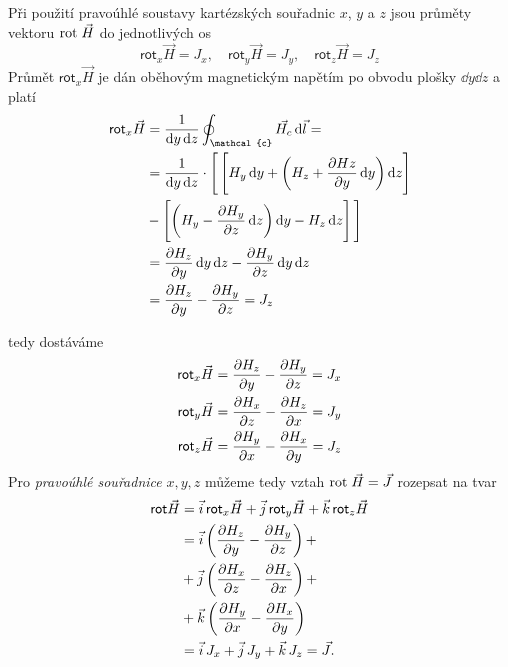       Při použití pravoúhlé soustavy kartézských souřadnic $x$, $y$ a $z$ jsou průměty vektoru
      $\mathrm{rot}\;\vec{H}$ do jednotlivých os
      \begin{equation}\label{TEMP:eq_amp_z3}
        \textsf{rot}_x\vec{H} = J_x,   \quad
        \textsf{rot}_y\vec{H} = J_y,   \quad
        \textsf{rot}_z\vec{H} = J_z    
      \end{equation}      
      Průmět $\textsf{rot}_x\vec{H}$ je dán oběhovým magnetickým napětím po obvodu plošky
      \(\dd{y}\dd{z}\) a platí
      \begin{align*}
        \textsf{rot}_x\vec{H} 
        &=\frac{1}{\dd{y}\dd{z}}\oint_{\mathcal{c}}\vec{H_c}\dd{\vec{l}} =               \nonumber\\
        &=\frac{1}{\dd{y}\dd{z}}\cdot\Biggl[\Biggr.\left[H_y\dd{y} 
         +\left(H_z + \pder{Hz}{y}\dd{y}\right)\dd{z}\right]                             \nonumber\\     
        &-\left[\left(H_y-\pder{H_y}{z}\dd{z}\right)\dd{y}-H_z\dd{z}\right]\Biggl.\Biggr]\nonumber\\
        &=\pder{H_z}{y}\dd{y}\dd{z} - \pder{H_y}{z}\dd{y}\dd{z}                          \nonumber\\    
        &=\pder{H_z}{y} - \pder{H_y}{z} = J_z
      \end{align*}       
      
         
      tedy dostáváme
      \begin{subequations}
        \begin{align}\label{TEMP:eq_amp_z5}
          \textsf{rot}_x\vec{H} &= \dfrac{\partial H_z}{\partial y} - \dfrac{\partial H_y}{\partial z} = J_x       \\
          \textsf{rot}_y\vec{H} &= \dfrac{\partial H_x}{\partial z} - \dfrac{\partial H_z}{\partial x} = J_y       \\
          \textsf{rot}_z\vec{H} &= \dfrac{\partial H_y}{\partial x} - \dfrac{\partial H_x}{\partial y} = J_z            
        \end{align}    
    \end{subequations}    
      Pro \emph{pravoúhlé souřadnice} $x, y, z$ můžeme tedy vztah $\mathrm{rot}\;\vec{H} = \vec{J}$ rozepsat na
      tvar
      \begin{align*}
        \textsf{rot}\vec{H} 
          &= \vec{i}\,\textsf{rot}_x\vec{H} + 
             \vec{j}\,\textsf{rot}_y\vec{H} +
             \vec{k}\,\textsf{rot}_z\vec{H}                                    \\
          &= \vec{i}\left(\dfrac{\partial H_z}{\partial y} - \dfrac{\partial H_y}{\partial z}\right) +               \\
          &+ \vec{j}\left(\dfrac{\partial H_x}{\partial z} - \dfrac{\partial H_z}{\partial x}\right) +               \\
          &+ \vec{k}\left(\dfrac{\partial H_y}{\partial x} - \dfrac{\partial H_x}{\partial y}\right)                 \\  
          &= \vec{i}\,J_x + \vec{j}\,J_y + \vec{k}\,J_z = \vec{J}.
      \end{align*}          
      
